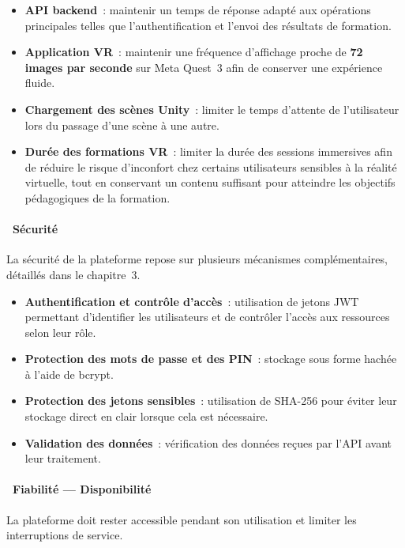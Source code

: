 \begin{itemize}
  \item \textbf{API backend}~: maintenir un temps de réponse adapté aux opérations
    principales telles que l'authentification et l'envoi des résultats de formation.
  \item \textbf{Application VR}~: maintenir une fréquence d'affichage proche de
    \textbf{72 images par seconde} sur Meta Quest~3 afin de conserver une expérience fluide.
  \item \textbf{Chargement des scènes Unity}~: limiter le temps d'attente de
    l'utilisateur lors du passage d'une scène à une autre.
  \item \textbf{Durée des formations VR}~: limiter la durée des sessions immersives
afin de réduire le risque d'inconfort chez certains utilisateurs sensibles à la
réalité virtuelle, tout en conservant un contenu suffisant pour atteindre les
objectifs pédagogiques de la formation.
\end{itemize}

\paragraph*{\textbullet~Sécurité}

La sécurité de la plateforme repose sur plusieurs mécanismes complémentaires,
détaillés dans le chapitre~3.

\begin{itemize}
  \item \textbf{Authentification et contrôle d'accès}~: utilisation de jetons JWT
    permettant d'identifier les utilisateurs et de contrôler l'accès aux ressources
    selon leur rôle.
  \item \textbf{Protection des mots de passe et des PIN}~: stockage sous forme
    hachée à l'aide de bcrypt.
  \item \textbf{Protection des jetons sensibles}~: utilisation de SHA-256 pour
    éviter leur stockage direct en clair lorsque cela est nécessaire.
  \item \textbf{Validation des données}~: vérification des données reçues par
    l'API avant leur traitement.
\end{itemize}

\paragraph*{\textbullet~Fiabilité --- Disponibilité}

La plateforme doit rester accessible pendant son utilisation et limiter les
interruptions de service.

